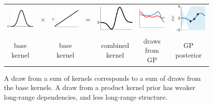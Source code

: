 \begin{figure}
\begin{tabular}{ccccc|c|c}
   \includegraphics[width=\fw]{../figures/structure_examples/se_kernel} & $\times$ & \includegraphics[width=\fw]{../figures/structure_examples/lin_kernel} & = & \includegraphics[width=\fw]{../figures/structure_examples/se_times_lin} & \includegraphics[width=\fw]{../figures/structure_examples/se_times_lin_draws} & \includegraphics[width=\fw]{../figures/structure_examples/se_times_lin_post} \\
base kernel & & base kernel & & combined kernel & draws from GP & GP posterior
\end{tabular}
\caption{ A draw from a sum of kernels corresponds to a sum of draws from the base kernels.  A draw from a product kernel prior has weaker long-range dependencies, and less long-range structure.
}
\label{fig:kernels}
\end{figure}
